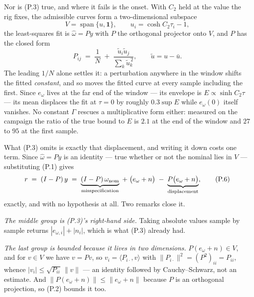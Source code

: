 \documentclass[10pt]{article}
\begin{document}
Nor is (P.3) true, and where it fails is the onset. With $C_2$ held at
the value the rig fixes, the admissible curves form a two-dimensional
subspace
\begin{equation}
  V = \operatorname{span}\{u,\mathbf 1\},
  \qquad u_i = \cosh C_2\tau_i - 1 ,
  \tag{P.4}
\end{equation}
the least-squares fit is $\hat\omega = Py$ with $P$ the orthogonal
projector onto $V$, and $P$ has the closed form
\begin{equation}
  P_{ij} \;=\; \frac1N \;+\;
    \frac{\tilde u_i\tilde u_j}{\sum_k\tilde u_k^{\,2}},
  \qquad \tilde u = u - \bar u .
  \tag{P.5}
\end{equation}
The leading $1/N$ alone settles it: a perturbation anywhere in the
window shifts the fitted \emph{constant}, and so moves the fitted curve
at every sample including the first. Since $e_\omega$ lives at the far
end of the window --- its envelope is $E\propto\sinh C_2\tau$ --- its
mean displaces the fit at $\tau = 0$ by roughly $0.3\sup E$ while
$e_\omega(0)$ itself vanishes. No constant $\Gamma$ rescues a
multiplicative form either: measured on the campaign the ratio of the
true bound to $E$ is $2.1$ at the end of the window and $27$ to $95$ at
the first sample.

What (P.3) omits is exactly that displacement, and writing it down costs
one term. Since $\hat\omega = Py$ is an identity --- true whether or not
the nominal lies in $V$ --- substituting (P.1) gives
\begin{equation}
  r \;=\; (I-P)\,y
    \;=\; \underbrace{(I-P)\,\omega_{\rm nom}}_{\text{misspecification}}
      \;+\; \bigl(e_\omega + n\bigr)
      \;-\; \underbrace{P\bigl(e_\omega + n\bigr)}_{\text{displacement}} ,
  \tag{P.6}
\end{equation}
exactly, and with no hypothesis at all. Two remarks close it.

\emph{The middle group is (P.3)'s right-hand side.} Taking absolute
values sample by sample returns $|e_{\omega,i}| + |n_i|$, which is what
(P.3) already had.

\emph{The last group is bounded because it lives in two dimensions.}
$P(e_\omega+n)\in V$, and for $v\in V$ we have $v = Pv$, so
$v_i = \langle P_{i\cdot},v\rangle$ with
$\|P_{i\cdot}\|^2 = (P^2)_{ii} = P_{ii}$, whence
$|v_i| \le \sqrt{P_{ii}}\,\|v\|$ --- an identity followed by
Cauchy--Schwarz, not an estimate. And $\|P(e_\omega+n)\| \le
\|e_\omega+n\|$ because $P$ is an orthogonal projection, so (P.2)
bounds it too.
\end{document}
